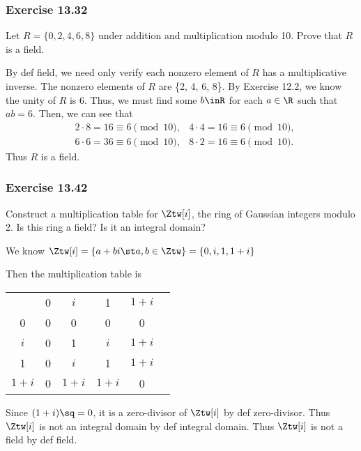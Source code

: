\documentclass{article}
\begin{document}
\subsubsection*{Exercise 13.32}
Let \( R = \{0, 2, 4, 6, 8\} \) under addition and multiplication modulo 10. Prove that \( R \) is a field.

\begin{solution} %
  By def field, we need only verify each nonzero element of \( R \) has a multiplicative inverse. The nonzero elements of \( R \) are \{2, 4, 6, 8\}. By Exercise 12.2, we know the unity of \( R \) is 6. Thus, we must find some \( b\inR \) for each \( a\in\R \) such that \( ab = 6 \). Then, we can see that
  \begin{align*}
    &2\cdot 8 = 16 \equiv 6 \pmod{10}, &4\cdot 4 = 16 \equiv 6 \pmod{10}, \\
    &6\cdot 6 = 36 \equiv 6 \pmod{10}, &8\cdot 2 = 16 \equiv 6 \pmod{10}.
  \end{align*}
  Thus \( R \) is a field.
\end{solution}

\subsubsection*{Exercise 13.42}
Construct a multiplication table for \( \Ztw[i] \), the ring of Gaussian integers modulo 2. Is this ring a field? Is it an integral domain?

\begin{solution} %
  We know \( \Ztw[i] = \{a+bi\st a,b\in\Ztw\} = \{0, i, 1, 1+i\} \)

  Then the multiplication table is
  \begin{center}
    \begin{tabular}{c | c c c c c}
                  & 0       & \( i \)   & 1         & \( 1+i \) \\ \cline{1-5}
        0         & 0       & 0         & 0         & 0  \\
        \( i \)   & 0       & 1         & \( i \)   & \( 1+i \)  \\
        1         & 0       & \( i \)   & 1         & \( 1+i \)  \\
        \( 1+i \) & 0       & \( 1+i \) & \( 1+i \) & 0
    \end{tabular}
  \end{center}
  Since \( (1+i)\sq = 0 \), it is a zero-divisor of \( \Ztw[i] \) by def zero-divisor. Thus \( \Ztw[i] \) is not an integral domain by def integral domain.
  Thus \( \Ztw[i] \) is not a field by def field.
\end{solution}
\end{document}
